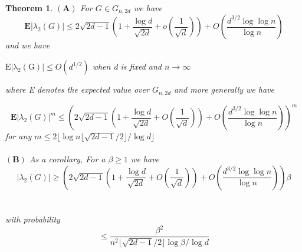\documentclass[oneside]{book}
\newtheorem{theorem}{Theorem}[section]
\begin{document}
	
	\begin{theorem} \label{t:13}
		$ \left(\mathbf{A} \right) $ For $G \in{G}_{n, 2d}$ we have
		$$
		\mathbf{E}\left|\lambda_{2}(G)\right| \leq 2 \sqrt{2 d-1}\left(1+\frac{\log d}{\sqrt{2 d}}+o\left(\frac{1}{\sqrt{d}}\right)\right)+O\left(\frac{d^{3 / 2} \log \log n}{\log n}\right)
		$$  and we have \begin{center}
			$\mathrm{E|\lambda_{2}(G)|} \leq O(d^{1/2})$ when d is fixed and $n\rightarrow \infty$
		\end{center}
		where E denotes the expected
		value over ${G}_{n, 2d}$      and more generally we have
		
		
		$$\mathbf{E}\left|\lambda_{2}(G)\right|^{m} \leq\left(2 \sqrt{2 d-1}\left(1+\frac{\log d}{\sqrt{2 d}}+O\left(\frac{1}{\sqrt{d}}\right)\right)+O\left(\frac{d^{3 / 2} \log \log n}{\log n}\right)\right)^{m}$$ 
		for any $ m \leq 2\lfloor\log n\lfloor\sqrt{2 d-1} / 2\rfloor / \log d\rfloor$\\\\
		$ \left(\mathbf{B}\right) $   As a corollary, For a $\beta\geq 1$ we have 
		$$\left|\lambda_{2}(G)\right| \geq\left(2 \sqrt{2 d-1}\left(1+\frac{\log d}{\sqrt{2 d}}+O\left(\frac{1}{\sqrt{d}}\right)\right)+O\left(\frac{d^{3 / 2} \log \log n}{\log n}\right)\right) \beta$$\\\\
		with probability
		$$
		\leq \frac{\beta^{2}}{n^{2}\lfloor\sqrt{2 d-1} / 2\rfloor \log \beta / \log d}
		$$   \\\\
	\end{theorem}
\end{document}
